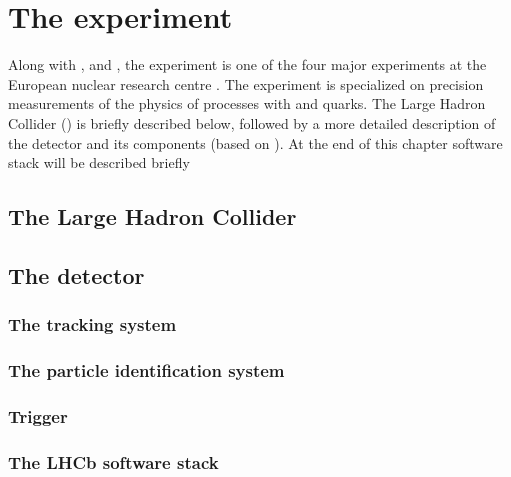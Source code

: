 \chapter{The \lhcb experiment}

Along with \atlas, \cms and \alice, the \lhcb experiment is one of the four major experiments at the European nuclear research centre \cern.
The experiment is specialized on precision measurements of the physics of processes with \bquark and \cquark quarks.
The Large Hadron Collider (\lhc) is briefly described below, followed by a more detailed description of the \lhcb detector and its components (based on \cite{LHCbDetectorReference}).
At the end of this chapter \lhcb software stack will be described briefly

\section{The Large Hadron Collider}

\Blindtext

\section{The \lhcb detector}

\Blindtext

\subsection{The tracking system}

\subsection{The particle identification system}

\subsection{Trigger}

\subsection{The LHCb software stack}
